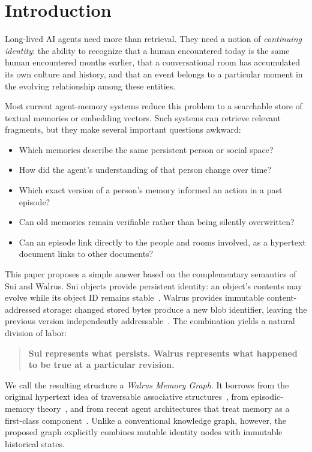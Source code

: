 \documentclass[11pt]{article}
\begin{document}
\section{Introduction}

Long-lived AI agents need more than retrieval. They need a notion of \emph{continuing identity}: the ability to recognize that a human encountered today is the same human encountered months earlier, that a conversational room has accumulated its own culture and history, and that an event belongs to a particular moment in the evolving relationship among these entities.

Most current agent-memory systems reduce this problem to a searchable store of textual memories or embedding vectors. Such systems can retrieve relevant fragments, but they make several important questions awkward:

\begin{itemize}[nosep]
    \item Which memories describe the same persistent person or social space?
    \item How did the agent's understanding of that person change over time?
    \item Which exact version of a person's memory informed an action in a past episode?
    \item Can old memories remain verifiable rather than being silently overwritten?
    \item Can an episode link directly to the people and rooms involved, as a hypertext document links to other documents?
\end{itemize}

This paper proposes a simple answer based on the complementary semantics of Sui and Walrus. Sui objects provide persistent identity: an object's contents may evolve while its object ID remains stable~\cite{sui}. Walrus provides immutable content-addressed storage: changed stored bytes produce a new blob identifier, leaving the previous version independently addressable~\cite{walrus-lineage,walrus-whitepaper}. The combination yields a natural division of labor:

\begin{quote}
\textbf{Sui represents what persists. Walrus represents what happened to be true at a particular revision.}
\end{quote}

We call the resulting structure a \emph{Walrus Memory Graph}. It borrows from the original hypertext idea of traversable associative structures~\cite{bush,nelson}, from episodic-memory theory~\cite{tulving}, and from recent agent architectures that treat memory as a first-class component~\cite{generative-agents,memgpt}. Unlike a conventional knowledge graph, however, the proposed graph explicitly combines mutable identity nodes with immutable historical states.
\end{document}
